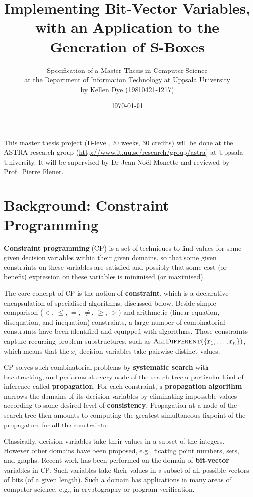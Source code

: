 \documentclass[a4paper,11pt]{article}
\title{Implementing Bit-Vector Variables,\\ with an Application to the
  Generation of S-Boxes}
\author{Specification of a Master Thesis in Computer Science \\
  at the Department of Information Technology at Uppsala University \\
  by
  \href{mailto:Kellen.Dye.0894@student.uu.se}{Kellen Dye}
  (19810421-1217)
}
\date{\today}
\newcommand{\AllDifferent}{\Constraint{AllDifferent}}
\newcommand{\Constraint}[1]{\textsc{#1}}
\newcommand{\Set}[1]{\left\{#1\right\}}
\begin{document}
\maketitle

\noindent
This master thesis project (D-level, 20 weeks, 30 credits) will be
done at the ASTRA research group
(\url{http://www.it.uu.se/research/group/astra}) at Uppsala
University.  It will be supervised by Dr Jean-No\"el Monette and reviewed
by Prof.\ Pierre Flener.

\section*{Background: Constraint Programming}

\textbf{Constraint programming} (CP) \cite{constraintshandbook} is a
set of techniques to find values for some given decision variables
within their given domains, so that some given constraints on these
variables are satisfied and possibly that some cost (or benefit)
expression on these variables is minimised (or maximised).

The core concept of CP is the notion of \textbf{constraint}, which is
a declarative encapsulation of specialised algorithms, discussed
below.  Beside simple comparison ($<$, $\leq$, $=$, $\neq$, $\geq$,
$>$) and arithmetic (linear equation, disequation, and inequation)
constraints, a large number of combinatorial constraints have been
identified and equipped with algorithms. Those constraints capture
recurring problem substructures, such as
$\AllDifferent(\Set{x_1,\dots,x_n})$, which means that the $x_i$
decision variables take pairwise distinct values.

CP solves such combinatorial problems by \textbf{systematic search}
with backtracking, and performs at every node of the search tree a
particular kind of inference called \textbf{propagation}.  For each
constraint, a \textbf{propagation algorithm} narrows the domains of
its decision variables by eliminating impossible values according to
some desired level of \textbf{consistency}.  Propagation at a node of
the search tree then amounts to computing the greatest simultaneous
fixpoint of the propagators for all the constraints.

Classically, decision variables take their values in a subset of the
integers. However other domains have been proposed, e.g., floating
point numbers, sets, and graphs. Recent work has been performed on the
domain of \textbf{bit-vector} variables in CP. Such variables take
their values in a subset of all possible vectors of bits (of a given
length). Such a domain has applications in many areas of computer
science, e.g., in cryptography or program verification.
\end{document}
